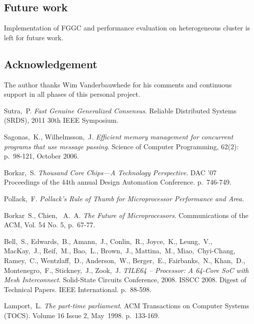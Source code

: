 \documentclass[english,11pt]{article}
\begin{document}
\subsection{Future work}

Implementation of FGGC and performance evaluation on heterogeneous cluster is
left for future work.

\subsection{Acknowledgement}

The author thanks Wim Vanderbauwhede for his comments and continuous support in
all phases of this personal project.

\clearpage
\begin{thebibliography}{99}

     Sutra,~P. \emph{Fast Genuine Generalized Consensus}. Reliable
        Distributed Systems (SRDS), 2011 30th IEEE Symposium.

     Sagonas,~K., Wilhelmsson,~J. \emph{Efficient memory
        management for concurrent programs that use message passing}. Science of
        Computer Programming, 62(2): p.~98-121, October 2006.

     Borkar,~S. \emph{Thousand Core Chips—A Technology
        Perspective}. DAC '07 Proceedings of the 44th annual Design Automation
        Conference. p.~746-749.

     Pollack,~F. \emph{Pollack's Rule of Thumb for
        Microprocessor Performance and Area.}

     Borkar~S., Chien,~ A.~A. \emph{The Future
        of Microprocessors}. Communications of the ACM, Vol. 54 No. 5, p.~67-77.

     Bell,~S., Edwards,~B., Amann,~J., Conlin,~R.,
        Joyce,~K., Leung,~V., MacKay,~J., Reif,~M., Bao,~L., Brown,~J.,
        Mattina,~M., Miao,~Chyi-Chang, Ramey,~C., Wentzlaff,~D.,
        Anderson,~W., Berger,~E., Fairbanks,~N., Khan,~D., Montenegro,~F.,
        Stickney,~J., Zook,~J. \emph{TILE64 -- Processor: A 64-Core SoC with
        Mesh Interconnect}. Solid-State Circuits Conference, 2008. ISSCC 2008.
        Digest of Technical Papers. IEEE International. p.~88-598.

     Lamport,~L. \emph{The part-time parliament}. ACM
        Transactions on Computer Systems (TOCS). Volume 16 Issue 2, May~1998.
        p.~133-169.


\end{thebibliography}
\end{document}

